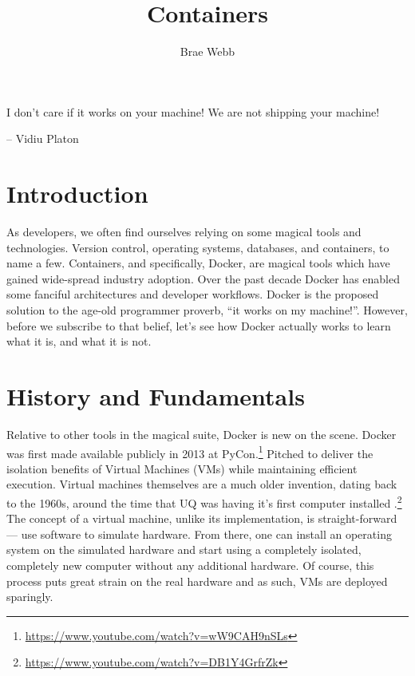\title{Containers}
\author{Brae Webb}
\date{}

\maketitle


\begin{oldquote}
I don't care if it works on your machine! We are not shipping your machine!

\raggedleft -- Vidiu Platon
\end{oldquote}

\section{Introduction}
As developers, we often find ourselves relying on some magical tools and technologies.
Version control, operating systems, databases, and containers, to name a few.
Containers, and specifically, Docker, are magical tools which have gained wide-spread industry adoption.
Over the past decade Docker has enabled some fanciful architectures and developer workflows.
Docker is the proposed solution to the age-old programmer proverb, ``it works on my machine!''.
However, before we subscribe to that belief, let's see how Docker actually works to learn what it is, and what it is not.

\section{History and Fundamentals}
Relative to other tools in the magical suite, Docker is new on the scene.
Docker was first made available publicly in 2013 at PyCon.\footnote{\url{https://www.youtube.com/watch?v=wW9CAH9nSLs}}
Pitched to deliver the isolation benefits of Virtual Machines (VMs) while maintaining efficient execution.
Virtual machines themselves are a much older invention, dating back to the 1960s, around the time that UQ was having it's first computer installed%
.\footnote{\url{https://www.youtube.com/watch?v=DB1Y4GrfrZk}}
The concept of a virtual machine, unlike its implementation, is straight-forward --- use software to simulate hardware.
From there, one can install an operating system on the simulated hardware and start using a completely isolated, completely new computer without any additional hardware.
Of course, this process puts great strain on the real hardware and as such, VMs are deployed sparingly.

